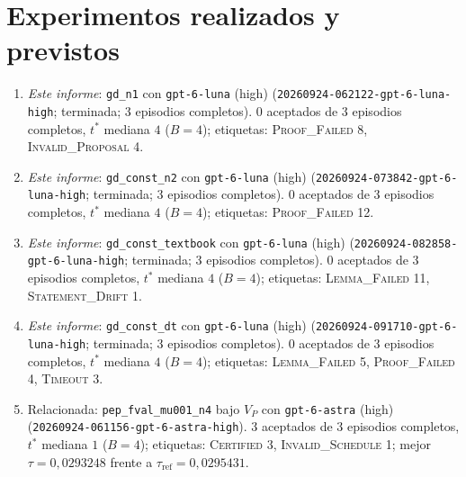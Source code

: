 \documentclass[11pt,a4paper]{article}
\begin{document}
\section{Experimentos realizados y previstos}

{\raggedright
\begin{enumerate}
  \item \emph{Este informe}: \texttt{gd\_\allowbreak{}n1} con \texttt{gpt-\allowbreak{}6-\allowbreak{}luna} (high) (\texttt{20260924-\allowbreak{}062122-\allowbreak{}gpt-\allowbreak{}6-\allowbreak{}luna-\allowbreak{}high}; terminada; 3 episodios completos). 0 aceptados de 3 episodios completos, $t^*$ mediana $4$ ($B = 4$); etiquetas: \textsc{Proof\_Failed} 8, \textsc{Invalid\_Proposal} 4.
  \item \emph{Este informe}: \texttt{gd\_\allowbreak{}const\_\allowbreak{}n2} con \texttt{gpt-\allowbreak{}6-\allowbreak{}luna} (high) (\texttt{20260924-\allowbreak{}073842-\allowbreak{}gpt-\allowbreak{}6-\allowbreak{}luna-\allowbreak{}high}; terminada; 3 episodios completos). 0 aceptados de 3 episodios completos, $t^*$ mediana $4$ ($B = 4$); etiquetas: \textsc{Proof\_Failed} 12.
  \item \emph{Este informe}: \texttt{gd\_\allowbreak{}const\_\allowbreak{}textbook} con \texttt{gpt-\allowbreak{}6-\allowbreak{}luna} (high) (\texttt{20260924-\allowbreak{}082858-\allowbreak{}gpt-\allowbreak{}6-\allowbreak{}luna-\allowbreak{}high}; terminada; 3 episodios completos). 0 aceptados de 3 episodios completos, $t^*$ mediana $4$ ($B = 4$); etiquetas: \textsc{Lemma\_Failed} 11, \textsc{Statement\_Drift} 1.
  \item \emph{Este informe}: \texttt{gd\_\allowbreak{}const\_\allowbreak{}dt} con \texttt{gpt-\allowbreak{}6-\allowbreak{}luna} (high) (\texttt{20260924-\allowbreak{}091710-\allowbreak{}gpt-\allowbreak{}6-\allowbreak{}luna-\allowbreak{}high}; terminada; 3 episodios completos). 0 aceptados de 3 episodios completos, $t^*$ mediana $4$ ($B = 4$); etiquetas: \textsc{Lemma\_Failed} 5, \textsc{Proof\_Failed} 4, \textsc{Timeout} 3.
  \item Relacionada: \texttt{pep\_\allowbreak{}fval\_\allowbreak{}mu001\_\allowbreak{}n4} bajo $V_P$ con \texttt{gpt-\allowbreak{}6-\allowbreak{}astra} (high) (\texttt{20260924-\allowbreak{}061156-\allowbreak{}gpt-\allowbreak{}6-\allowbreak{}astra-\allowbreak{}high}). 3 aceptados de 3 episodios completos, $t^*$ mediana $1$ ($B = 4$); etiquetas: \textsc{Certified} 3, \textsc{Invalid\_Schedule} 1; mejor $\tau = 0{,}0293248$ frente a $\tau_{\mathrm{ref}} = 0{,}0295431$.

\end{enumerate}}
\end{document}
